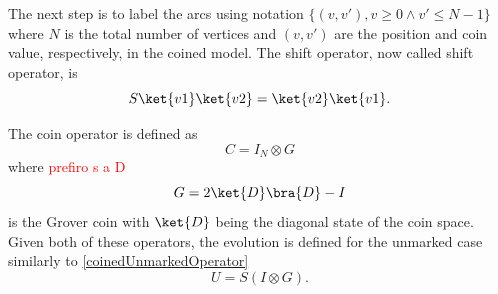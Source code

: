 %                
                The next step is to label the arcs using notation $\{(v,v'), v \geqslant 0 \land v' \leqslant N-1\}$ 
                where $N$ is the total number of vertices and $(v,v')$ are the position and coin value, respectively, in the coined model. 
                The shift operator, now called  shift operator, is
                \begin{equation}
                    S\ket{v1}\ket{v2} = \ket{v2}\ket{v1}.
                \end{equation}\par
                The coin operator is defined as
                \begin{equation}
                    C = I_N \otimes G
                \end{equation}
                where \textcolor{red}{prefiro s a D}
                \begin{equation}
                    G = 2\ket{D}\bra{D} - I
                \end{equation}
                is the Grover coin with $\ket{D}$ being the diagonal state of the coin space. Given both of these operators, the evolution is defined for the unmarked case similarly to \ref{coinedUnmarkedOperator}
                \begin{equation}
                    U = S(I \otimes G).
                \end{equation}\par
